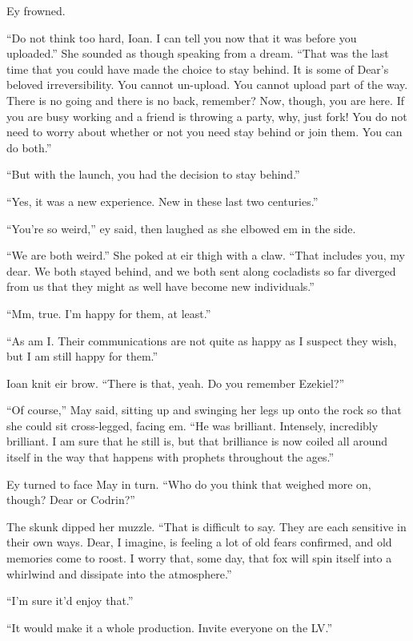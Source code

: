 Ey frowned.

``Do not think too hard, Ioan. I can tell you now that it was before you uploaded.'' She sounded as though speaking from a dream. ``That was the last time that you could have made the choice to stay behind. It is some of Dear's beloved irreversibility. You cannot un-upload. You cannot upload part of the way. There is no going and there is no back, remember? Now, though, you are here. If you are busy working and a friend is throwing a party, why, just fork! You do not need to worry about whether or not you need stay behind or join them. You can do both.''

``But with the launch, you had the decision to stay behind.''

``Yes, it was a new experience. New in these last two centuries.''

``You're so weird,'' ey said, then laughed as she elbowed em in the side.

``We are both weird.'' She poked at eir thigh with a claw. ``That includes you, my dear. We both stayed behind, and we both sent along cocladists so far diverged from us that they might as well have become new individuals.''

``Mm, true. I'm happy for them, at least.''

``As am I. Their communications are not quite as happy as I suspect they wish, but I am still happy for them.''

Ioan knit eir brow. ``There is that, yeah. Do you remember Ezekiel?''

``Of course,'' May said, sitting up and swinging her legs up onto the rock so that she could sit cross-legged, facing em. ``He was brilliant. Intensely, incredibly brilliant. I am sure that he still is, but that brilliance is now coiled all around itself in the way that happens with prophets throughout the ages.''

Ey turned to face May in turn. ``Who do you think that weighed more on, though? Dear or Codrin?''

The skunk dipped her muzzle. ``That is difficult to say. They are each sensitive in their own ways. Dear, I imagine, is feeling a lot of old fears confirmed, and old memories come to roost. I worry that, some day, that fox will spin itself into a whirlwind and dissipate into the atmosphere.''

``I'm sure it'd enjoy that.''

``It would make it a whole production. Invite everyone on the LV.''

